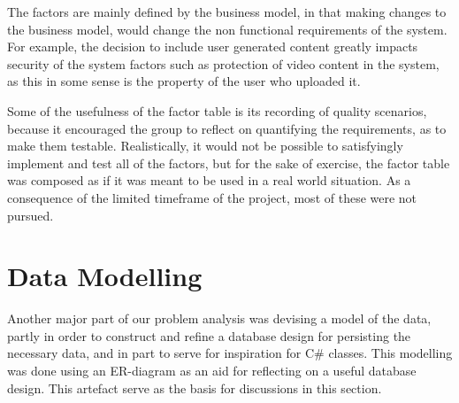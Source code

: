 The factors are mainly defined by the business model, in that making changes to the business model, would change the non functional requirements of the system.  For example, the decision to include user generated content greatly impacts security of the system factors such as protection of video content in the system, as this in some sense is the property of the user who uploaded it.

Some of the usefulness of the factor table is its recording of quality scenarios, because it encouraged the group to reflect on quantifying the requirements, as to make them testable. Realistically, it would not be possible to satisfyingly implement and test all of the factors, but for the sake of exercise, the factor table was composed as if it was meant to be used in a real world situation. As a consequence of the limited timeframe of the project, most of these were not pursued.

\section{Data Modelling}
Another major part of our problem analysis was devising a model of the data, partly in order to construct and refine a database design for persisting the necessary data, and in part to serve for inspiration for C\# classes.
This modelling was done using  an ER-diagram as an aid for reflecting on a useful database design. This artefact serve as the basis for discussions in this section.

